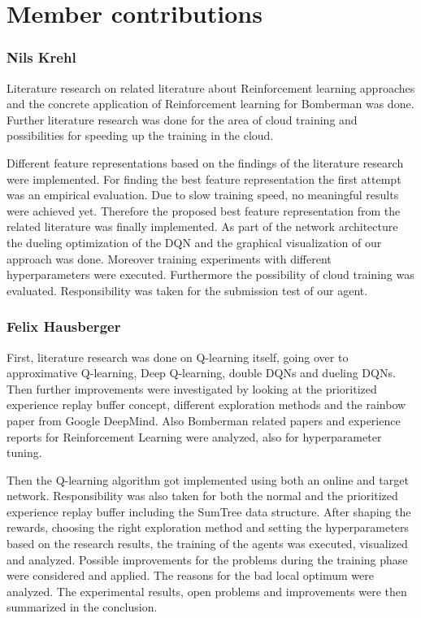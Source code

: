 \section*{Member contributions}

\subsubsection*{Nils Krehl}

Literature research on related literature about Reinforcement learning approaches and the concrete application of Reinforcement learning for Bomberman was done. Further literature research was done for the area of cloud training and possibilities for speeding up the training in the cloud.

Different feature representations based on the findings of the literature research were implemented. For finding the best feature representation the first attempt was an empirical evaluation. Due to slow training speed, no meaningful results were achieved yet. Therefore the proposed best feature representation from the related literature was finally implemented.
As part of the network architecture the dueling optimization of the DQN and the graphical visualization of our approach was done.
Moreover training experiments with different hyperparameters were executed.
Furthermore the possibility of cloud training was evaluated.
Responsibility was taken for the submission test of our agent.

\subsubsection*{Felix Hausberger}

First, literature research was done on Q-learning itself, going over to approximative Q-learning, Deep Q-learning, double DQNs and dueling DQNs. Then further improvements were investigated by looking at the prioritized experience replay buffer concept, different exploration methods and the rainbow paper from Google DeepMind. Also Bomberman related papers and experience reports for Reinforcement Learning were analyzed, also for hyperparameter tuning. 

Then the Q-learning algorithm got implemented using both an online and target network. Responsibility was also taken for both the normal and the prioritized experience replay buffer including the SumTree data structure. After shaping the rewards, choosing the right exploration method and setting the hyperparameters based on the research results, the training of the agents was executed, visualized and analyzed. Possible improvements for the problems during the training phase were considered and applied. The reasons for the bad local optimum were analyzed. The experimental results, open problems and improvements were then summarized in the conclusion.
